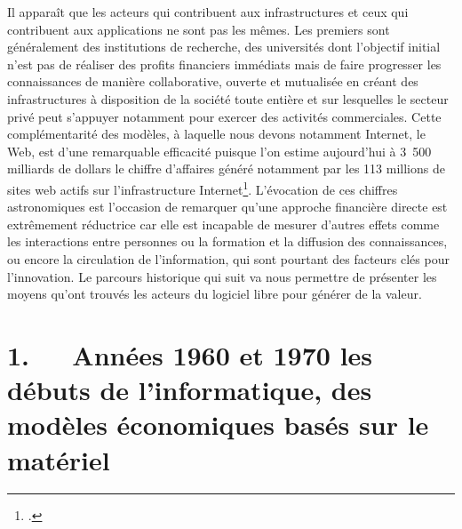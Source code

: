\documentclass{FramateX}
\begin{document}
\begin{refsection}
Il apparaît que les acteurs qui contribuent aux infrastructures et ceux
qui contribuent aux applications ne sont pas les mêmes. Les premiers
sont généralement des institutions de recherche, des universités dont
l'objectif initial n'est pas de réaliser des profits financiers
immédiats mais de faire progresser les connaissances de manière
collaborative, ouverte et mutualisée en créant des infrastructures à
disposition de la société toute entière et sur lesquelles le secteur
privé peut s'appuyer notamment pour exercer des activités commerciales.
Cette complémentarité des modèles, à laquelle nous devons notamment
Internet, le Web, est d'une remarquable efficacité puisque l'on estime
aujourd'hui à 3~500 %
milliards de dollars le chiffre d'affaires généré
notamment par les 113 millions de sites web actifs sur l'infrastructure
Internet\footnote{\cite{mogleninnovation2012}.}.%
 L'évocation de ces chiffres astronomiques est
l'occasion de remarquer qu'une approche financière directe est
extrêmement réductrice car elle est incapable de mesurer d'autres
effets comme les interactions entre personnes ou la formation et la
diffusion des connaissances, ou encore la circulation de l'information,
qui sont pourtant des facteurs clés pour l'innovation. Le parcours
historique qui suit va nous permettre de présenter les moyens qu'ont
trouvés les acteurs du logiciel libre pour générer de la valeur.






\section*{1.~~~Années 1960 et 1970 les débuts de l'informatique, des modèles économiques basés sur le matériel}
{}


\end{refsection}
\end{document}
